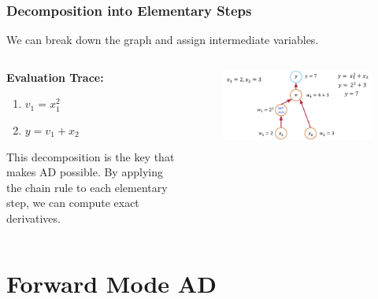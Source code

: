 \documentclass[notes]{beamer}
\begin{document}
\begin{frame}
\frametitle{Decomposition into Elementary Steps}

We can break down the graph and assign intermediate variables.

\begin{columns}[T]
    \begin{column}{0.4\textwidth}
        \textbf{Evaluation Trace:}
        \begin{enumerate}
            \item $v_1 = x_1^2$
            \item $y = v_1 + x_2$
        \end{enumerate}
        
        \vspace{1cm}
        
        This decomposition is the key that makes AD possible. By applying the chain rule to each elementary step, we can compute exact derivatives.
        
    \end{column}
    \begin{column}{0.6\textwidth}
        \begin{figure}[ht]
        	\centering
        	\includegraphics[width=\linewidth]{figs/ad3.png}
        \end{figure}
    \end{column}
\end{columns}


\end{frame}

\section{Forward Mode AD}
\end{document}

